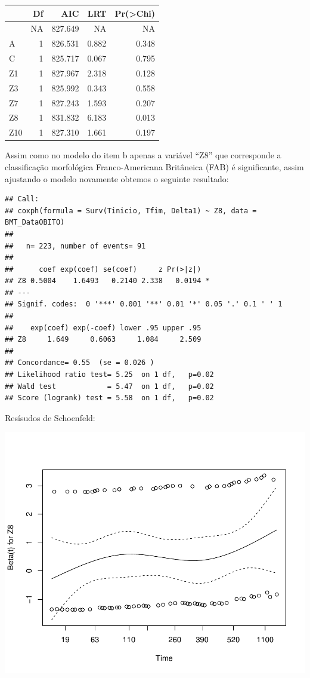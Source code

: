 \documentclass[]{article}
\begin{document}
\begin{longtable}[]{@{}lrrrr@{}}
\toprule
& Df & AIC & LRT & Pr(\textgreater{}Chi)\tabularnewline
\midrule
\endhead
& NA & 827.649 & NA & NA\tabularnewline
A & 1 & 826.531 & 0.882 & 0.348\tabularnewline
C & 1 & 825.717 & 0.067 & 0.795\tabularnewline
Z1 & 1 & 827.967 & 2.318 & 0.128\tabularnewline
Z3 & 1 & 825.992 & 0.343 & 0.558\tabularnewline
Z7 & 1 & 827.243 & 1.593 & 0.207\tabularnewline
Z8 & 1 & 831.832 & 6.183 & 0.013\tabularnewline
Z10 & 1 & 827.310 & 1.661 & 0.197\tabularnewline
\bottomrule
\end{longtable}

Assim como no modelo do item b apenas a variável ``Z8'' que corresponde
a classificação morfológica Franco-Americana Britâneica (FAB) é
significante, assim ajustando o modelo novamente obtemos o seguinte
resultado:

\begin{verbatim}
## Call:
## coxph(formula = Surv(Tinicio, Tfim, Delta1) ~ Z8, data = BMT_DataOBITO)
## 
##   n= 223, number of events= 91 
## 
##      coef exp(coef) se(coef)     z Pr(>|z|)  
## Z8 0.5004    1.6493   0.2140 2.338   0.0194 *
## ---
## Signif. codes:  0 '***' 0.001 '**' 0.01 '*' 0.05 '.' 0.1 ' ' 1
## 
##    exp(coef) exp(-coef) lower .95 upper .95
## Z8     1.649     0.6063     1.084     2.509
## 
## Concordance= 0.55  (se = 0.026 )
## Likelihood ratio test= 5.25  on 1 df,   p=0.02
## Wald test            = 5.47  on 1 df,   p=0.02
## Score (logrank) test = 5.58  on 1 df,   p=0.02
\end{verbatim}

Resísudos de Schoenfeld:

\begin{center}\includegraphics[width=0.8\linewidth]{Lista_5_files/figure-latex/unnamed-chunk-9-1} \end{center}
\end{document}
